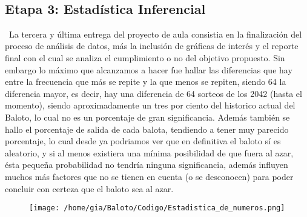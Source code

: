 \documentclass[11pt]{article}
\begin{document}
\
\subsection{Etapa 3: Estadística Inferencial}
\
La tercera y última entrega del proyecto de aula consistia en la finalización del proceso de análisis de datos, más la inclusión de gráficas de interés y el reporte final con el cual se analiza el cumplimiento o no del objetivo propuesto. Sin embargo lo máximo que alcanzamos a hacer fue hallar las diferencias que hay entre la frecuencia que más se repite y la que menos se repiten, siendo 64 la diferencia mayor, es decir, hay una diferencia de 64 sorteos de los 2042 (hasta el momento), siendo aproximadamente un tres por ciento del historico actual del Baloto, lo cual no es un porcentaje de gran significancia.
Además también se hallo el porcentaje de salida de cada balota, tendiendo a tener muy parecido porcentaje, lo cual desde ya podriamos ver que en definitiva el baloto sí es aleatorio, y si al menos existiera una mínima posibilidad de que fuera al azar, ésta pequeña probabilidad no tendría ninguna significancia, además influyen muchos más factores que no se tienen en cuenta (o se desconocen) para poder concluir con certeza que el baloto sea al azar. 

\begin{figure}[htp]
\centering
\texttt{[image: /home/gia/Baloto/Codigo/Estadistica\_de\_numeros.png]}
\caption{}
\label{}
\end{figure}
\end{document}
